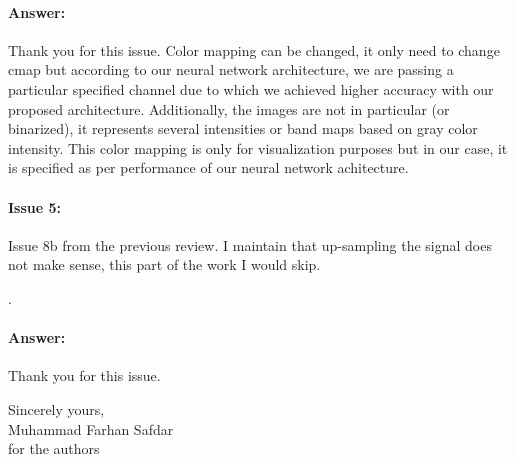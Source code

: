 \documentclass{article}
\begin{document}
\paragraph{Answer:}
Thank you for this issue. Color mapping can be changed, it only need to change cmap but according to our neural network architecture, we are passing a particular specified channel due to which we achieved higher accuracy with our proposed architecture. Additionally, the images are not in particular (or binarized), it represents several intensities or band maps based on gray color intensity. This color mapping is only for visualization purposes but in our case, it is specified as per performance of our neural network achitecture. 

\paragraph{Issue 5:}
\begin{displayquote}
Issue 8b from the previous review. I maintain that up-sampling the signal does not make sense, this part of the work I would skip.
\end{displayquote}.

\paragraph{Answer:}
Thank you for this issue. 


\vspace{0.25in}

Sincerely yours,\\
Muhammad Farhan Safdar\\
for the authors
\end{document}
